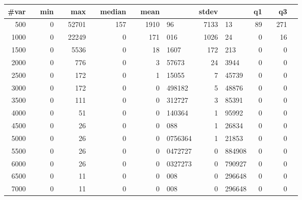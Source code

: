 \begin{tabular}{r@{.}lr@{.}lr@{.}lr@{.}lr@{.}lr@{.}lr@{.}lr@{.}l}
\toprule
\textbf{\#var}&	&\textbf{min}&	&\textbf{max}&	&\textbf{median}&	&\textbf{mean}&	&\textbf{stdev}&	&\textbf{q1}&	&\textbf{q3}&\\\midrule
500&	&0&	&52701&	&157&	&1910&96	&7133&13	&89&	&271&\\
1000&	&0&	&22249&	&0&	&171&016	&1026&24	&0&	&16&\\
1500&	&0&	&5536&	&0&	&18&1607	&172&213	&0&	&0&\\
2000&	&0&	&776&	&0&	&3&57673	&24&3944	&0&	&0&\\
2500&	&0&	&172&	&0&	&1&15055	&7&45739	&0&	&0&\\
3000&	&0&	&172&	&0&	&0&498182	&5&48876	&0&	&0&\\
3500&	&0&	&111&	&0&	&0&312727	&3&85391	&0&	&0&\\
4000&	&0&	&51&	&0&	&0&140364	&1&95992	&0&	&0&\\
4500&	&0&	&26&	&0&	&0&088	&1&26834	&0&	&0&\\
5000&	&0&	&26&	&0&	&0&0756364	&1&21853	&0&	&0&\\
5500&	&0&	&26&	&0&	&0&0472727	&0&884908	&0&	&0&\\
6000&	&0&	&26&	&0&	&0&0327273	&0&790927	&0&	&0&\\
6500&	&0&	&11&	&0&	&0&008	&0&296648	&0&	&0&\\
7000&	&0&	&11&	&0&	&0&008	&0&296648	&0&	&0&\\
\bottomrule
\end{tabular}